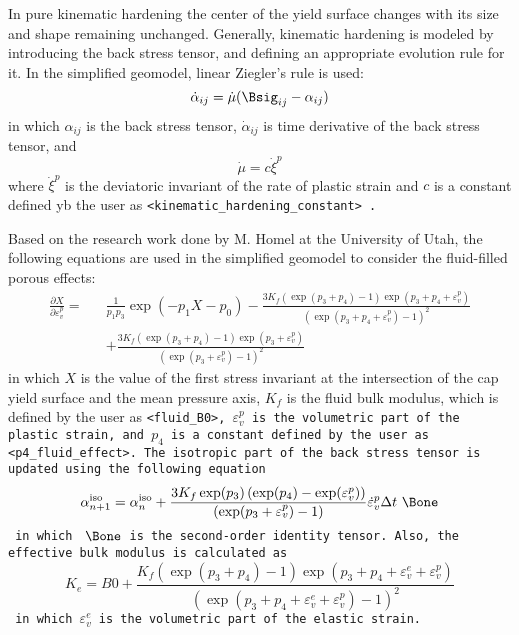 \begin{enumerate}
In pure kinematic hardening the center of the yield surface changes with its size and
shape remaining unchanged.
Generally, kinematic hardening is modeled by introducing the back stress tensor, and defining
an appropriate evolution rule for it. In the simplified geomodel, linear Ziegler’s rule is used:
\begin{equation}
\dot{\alpha}_{ij}=\dot{\mu}(\Bsig_{ij}-\alpha_{ij})
\end{equation}
in which $\alpha_{ij}$ is the back stress tensor, $\dot{\alpha}_{ij}$ is time derivative of 
the back stress tensor, and
\begin{equation}
\dot{\mu}=c\dot{\xi}^p
\end{equation}
where $\dot{\xi}^p$ is the deviatoric invariant of the rate of plastic strain and $c$ is a 
constant defined yb the user as \tt <kinematic\_hardening\_constant> \normalfont.

Based on the research work done by M. Homel at the University of Utah, the following equations
are used in the simplified geomodel to consider the fluid-filled porous effects:
\begin{eqnarray}
\frac{\partial X}{\partial\varepsilon^p_v}=
&& \frac{1}{p_1p_3}\exp{(-p_1X-p_0)}
-\frac{3K_f\left(\exp(p_3+p_4)-1\right)\exp(p_3+p_4+\varepsilon^p_v)}
{\left(\exp(p_3+p_4+\varepsilon^p_v)-1\right)^2} \nonumber \\
&& +\frac{3K_f\left(\exp(p_3+p_4)-1\right)\exp(p_3+\varepsilon^p_v)}
{\left(\exp(p_3+\varepsilon^p_v)-1\right)^2}
\end{eqnarray}
in which $X$ is the value of the first stress invariant at the 
intersection of the cap yield surface and the mean pressure axis, 
$K_f$ is the fluid bulk modulus, which is defined by the user as \tt <fluid\_B0>\normalfont, 
$\varepsilon^p_v$ is the volumetric part 
of the plastic strain, and $p_4$ is a constant defined by the user as 
\tt <p4\_fluid\_effect>\normalfont. The isotropic part of the back stress tensor
is updated using the following equation
\begin{equation}
\alpha^{\mathrm{iso}}_{n+1}=\alpha^{\mathrm{iso}}_{n}+
\frac{3K_f\exp(p_3)\left(\exp(p_4)-\exp(\varepsilon^p_v)\right)}
{\left(\exp(p_3+\varepsilon^p_v)-1\right)}
\dot{\varepsilon}^p_v\Delta t ~\Bone
\end{equation}
in which $~\Bone$ is the second-order identity tensor. Also, the effective bulk modulus 
is calculated as
\begin{equation}
K_e=B0+
\frac{K_f\left(\exp(p_3+p_4)-1\right)\exp(p_3+p_4+\varepsilon^e_v+\varepsilon^p_v)}
{\left(\exp(p_3+p_4+\varepsilon^e_v+\varepsilon^p_v)-1\right)^2}
\end{equation}
in which $\varepsilon^e_v$ is the volumetric part of the elastic strain.
           

\end{enumerate}
